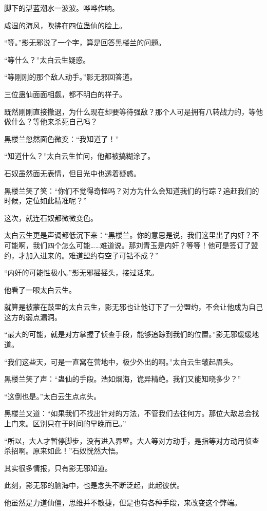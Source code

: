 \begin{this_body}
脚下的湛蓝潮水一波波。哗哗作响。

咸湿的海风，吹拂在四位蛊仙的脸上。

“等。”影无邪说了一个字，算是回答黑楼兰的问题。

“等什么？”太白云生疑惑。

“等刚刚的那个敌人动手。”影无邪回答道。

三位蛊仙面面相觑，都不明白的样子。

既然刚刚直接撤退，为什么现在却要等待强敌？那个人可是拥有八转战力的，等他做什么？等他来杀死自己吗？

黑楼兰忽然面色微变：“我知道了！”

“知道什么？”太白云生忙问，他都被搞糊涂了。

石奴虽然面无表情，但目光中也透着疑惑。

黑楼兰笑了笑：“你们不觉得奇怪吗？对方为什么会知道我们的行踪？追赶我们的时候，定位如此精准呢？”

这次，就连石奴都微微变色。

太白云生更是声调都低沉下来：“黑楼兰。你的意思是说，我们这里出了内奸？不可能啊，我们四个怎么可能……难道说。那刘青玉是内奸？等等！他可是签订了盟约，才加入进来的。难道盟约有空子可钻不成？”

“内奸的可能性极小。”影无邪摇摇头，接过话来。

他看了一眼太白云生。

就算是被蒙在鼓里的太白云生，影无邪也让他订下了一分盟约，不会让他成为自己这方的弱点漏洞。

“最大的可能，就是对方掌握了侦查手段，能够追踪到我们的位置。”影无邪缓缓地道。

“我们这些天，可是一直窝在营地中，极少外出的啊。”太白云生皱起眉头。

黑楼兰笑了声：“蛊仙的手段。浩如烟海，诡异精绝。我们又能知晓多少？”

“这倒也是。”太白云生点点头。

黑楼兰又道：“如果我们不找出针对的方法，不管我们去往何方。那位大敌总会找上门来。区别只在于时间的早晚而已。”

“所以，大人才暂停脚步，没有进入界壁。大人等对方动手，是指等对方动用侦查杀招啊。原来如此！”石奴恍然大悟。

其实很多情报，只有影无邪知道。

此刻，影无邪的脑海中，也是念头不断泛起，此起彼伏。

他虽然是力道仙僵，思维并不敏捷，但是也有各种手段，来改变这个弊端。


\end{this_body}
